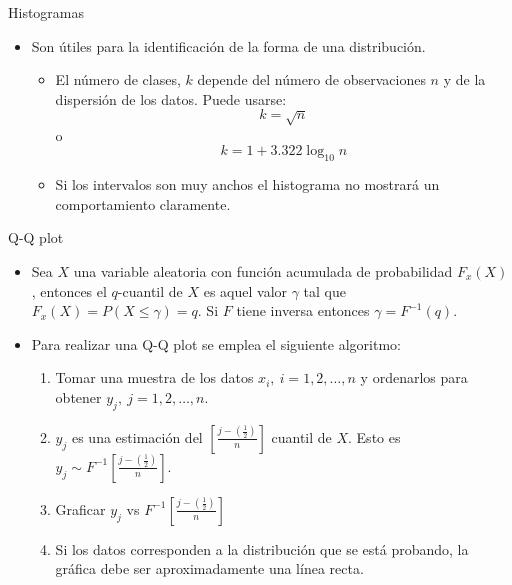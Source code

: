 \begin{frame}{Histogramas}
    \begin{itemize}
        \item Son útiles para la identificación de la forma de una distribución.
        \begin{itemize}
            \item El número de clases, $k$ depende del número de observaciones $n$ y de la dispersión de los datos. Puede usarse:
                \begin{equation*}
                    k=\sqrt{n}
                \end{equation*}
                o
                \begin{equation*}
                    k=1+3.322 \log_{10}{n}
                \end{equation*}
            \item Si los intervalos son muy anchos el histograma no mostrará  un comportamiento claramente.
        \end{itemize}
    \end{itemize}
\end{frame}

\begin{frame}{Q-Q plot}
    \begin{itemize}
        \item Sea $X$ una variable aleatoria con función acumulada de probabilidad $F_x(X)$, entonces el $q$-cuantil de $X$ es aquel valor $\gamma$ tal que $F_x(X)=P(X\leq \gamma)=q$. Si $F$ tiene inversa entonces $\gamma = F^{-1}(q)$.
        \item Para realizar una Q-Q plot se emplea el siguiente algoritmo:
        \begin{enumerate}
            \item Tomar una muestra de los datos $x_i,~ i=1,2,\dots, n$ y ordenarlos para obtener $y_j,~j=1,2,\dots,n$.
            \item $y_j$ es una estimación del $\left[\frac{j-\left(\frac{1}{2}\right)}{n}\right]$ cuantil de $X$. Esto es $y_j \sim F^{-1}\left[\frac{j-\left(\frac{1}{2}\right)}{n}\right]$.
            \item Graficar $y_j$ vs $F^{-1}\left[\frac{j-\left(\frac{1}{2}\right)}{n}\right]$
            \item Si los datos corresponden a la distribución que se está probando, la gráfica debe ser aproximadamente una línea recta.
        \end{enumerate}
    \end{itemize}
\end{frame}

